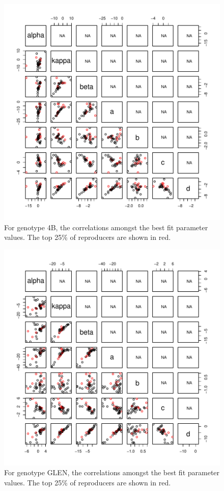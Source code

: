 \documentclass[12pt,reqno,final]{amsart}
\theoremstyle{plain}
\numberwithin{equation}{part}
\begin{document}
\begin{figure}
\includegraphics{Comparing_best_fit_parameters_against_Adriana_winners_and_losers-004}
\caption{For genotype 4B, the correlations amongst the best fit
  parameter values. The top 25\% of reproducers are shown in red.}
\end{figure}

\begin{figure}
\includegraphics{Comparing_best_fit_parameters_against_Adriana_winners_and_losers-005}
\caption{For genotype GLEN, the correlations amongst the best fit
  parameter values. The top 25\% of reproducers are shown in red.}
\end{figure}
\end{document}
